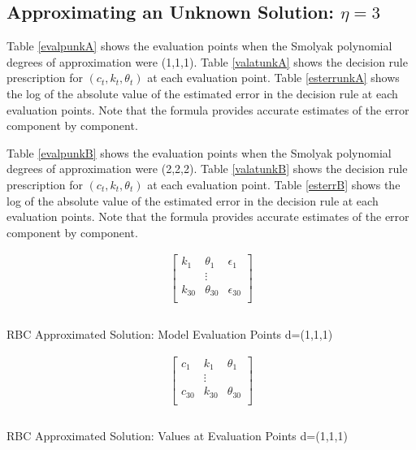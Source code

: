 \documentclass[12pt]{article}
\begin{document}
\clearpage
\subsection{Approximating an Unknown Solution: $\eta=3$ }
\label{sec:recov-unknown-solut}


Table \ref{evalpunkA} shows the evaluation points when the Smolyak polynomial 
degrees of approximation
were (1,1,1).  Table \ref{valatunkA} shows the decision rule prescription for $(c_t,k_t,\theta_t)$ at each evaluation point.   Table \ref{esterrunkA} shows the 
log of the absolute value of the estimated error in the decision rule
at each evaluation points.  Note that the formula provides accurate estimates
of the error component by component.



Table \ref{evalpunkB} shows the evaluation points when the Smolyak polynomial 
degrees of approximation
were (2,2,2).  Table \ref{valatunkB} shows the decision rule prescription for $(c_t,k_t,\theta_t)$ at each evaluation point.   Table \ref{esterrB} shows the 
log of the absolute value of the estimated error in the decision rule
at each evaluation points.  Note that the formula provides accurate estimates
of the error component by component.

 \begin{table}
   \centering
  
 \begin{gather*}
   \begin{bmatrix}
     k_1&\theta_1&\epsilon_1\\
 &\vdots\\
     k_{30}&\theta_{30}&\epsilon_{30}\\
   \end{bmatrix}\\
%  
 \end{gather*}\\
   \caption{RBC Approximated Solution: Model Evaluation Points \label{evalpunkA} d=(1,1,1)}
 \end{table}


\begin{table}
  \centering
  
\begin{gather*}
  \begin{bmatrix}
    c_1&k_1&\theta_1\\
&\vdots\\
    c_{30}&k_{30}&\theta_{30}\\
  \end{bmatrix}\\
%  
\end{gather*}\\
  \caption{RBC Approximated Solution: Values at Evaluation Points \label{valatunkA} d=(1,1,1)}
\end{table}
\end{document}
